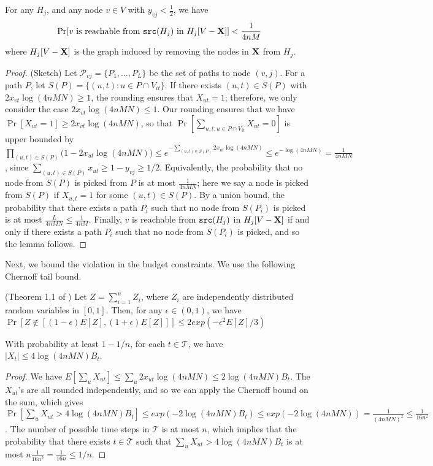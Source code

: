 \begin{lemma}
\label{lem:disconnect}
For any $H_j$, and any node $v\in V$ with $y_{vj} < \frac{1}{2}$, we have
\[
\Pr[\mbox{$v$ is reachable from $\texttt{src}(H_j)$ in $H_j[V-\mathbf{X}]$}] < \frac{1}{4nM}
\]
where $H_j[V-\mathbf{X}]$ is the graph induced by removing the nodes in $\mathbf{X}$ from $H_j$.
\end{lemma}
\begin{proof} (Sketch)
Let $\mathcal{P}_{vj} = \{P_1, \ldots,P_L\}$ be the  set of paths to node $(v,j)$. 
For a path $P$, let $S(P)=\{(u, t): u\in P\cap V_{it}\}$.
If there exists $(u, t)\in S(P)$ with $2 x_{vt} \log(4nMN) \geq 1$, the rounding ensures that $X_{ut}=1$;
therefore, we only consider the case $2 x_{vt} \log(4nMN)\leq 1$.
Our rounding ensures that we have $\Pr[X_{ut}=1] \geq 2 x_{vt} \log(4nMN)$, so that
$\Pr[\sum_{u, t: u\in P\cap V_{it}} X_{ut} = 0]$ is upper bounded by
$\prod_{(u,t) \in S(P)} \big(1- 2 x_{ut} \log(4nMN)\big) \leq e^{-\sum_{(u, t)\in S(P)} 2 x_{ut} \log(4nMN)}
\leq e^{-\log(4nMN)}= \frac{1}{4nMN}$,
since $\sum_{(u, t)\in S(P)} x_{ut} \geq 1-y_{vj} \geq 1/2$.
Equivalently, the probability that no node from $S(P)$ is picked from $P$ is at most $\frac{1}{4nMN}$;
here we say a node is picked from $S(P)$ if $X_{u,t}=1$ for some $(u, t)\in S(P)$.
By a union bound, the probability that there exists a path $P_i$ such that no node from
$S(P_i)$ is picked is at most $\frac{L}{4nMN}\leq \frac{1}{4nM}$.
Finally, $v$ is reachable from $\texttt{src}(H_j)$ in $H_j[V-\mathbf{X}]$ if and only if there exists a path $P_i$ such that no node from
$S(P_i)$ is picked, and so the lemma follows.
\end{proof}

Next, we bound the violation in the budget constraints. We use the following Chernoff tail bound.

\begin{theorem} (Theorem 1.1 of \cite{books/daglib/0025902})
Let $Z=\sum_{i=1}^n Z_i$, where $Z_i$ are independently distributed random variables in $[0, 1]$. Then, for any $\epsilon\in(0, 1)$, we have
$\Pr[Z\not\in[(1-\epsilon)E[Z], (1+\epsilon)E[Z]]]\leq 2 exp(-\epsilon^2 E[Z]/3)$
\end{theorem}

\noindent
\begin{lemma}
\label{lem:budget}
With probability at least $1-1/n$, for each $t\in \mathcal{T}$, we have
$|X_t|\leq 4\log(4nMN)B_t$.
\end{lemma}
\begin{proof}
We have $E[\sum_u X_{ut}]\leq \sum_u 2x_{ut}\log(4nMN) \leq 2\log(4nMN)B_t$.
The $X_{ut}$'s are all rounded independently, and so we can apply the Chernoff bound on the sum, which gives
$\Pr[\sum_u X_{ut} > 4\log(4nMN)B_t] \leq exp(-2\log(4nMN)B_t) \leq exp(-2\log(4nMN))= \frac{1}{(4nMN)^2}\leq \frac{1}{16n^2}$.
The number of possible time steps in $\mathcal{T}$ is at most $n$, which implies that the probability that there exists 
$t\in\mathcal{T}$ such that $\sum_u X_{ut} > 4\log(4nMN)B_t$ is at most $n\frac{1}{16n^2}=\frac{1}{16n}\leq 1/n$.
\end{proof}

